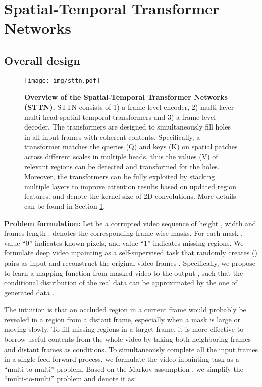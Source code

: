 \documentclass[runningheads]{llncs}
\begin{document}
\section{Spatial-Temporal Transformer Networks}
\label{sec:app}
\subsection{Overall design}
\label{sec:over}

\begin{figure}[t]
   \begin{center}
      \texttt{[image: img/sttn.pdf]}
   \end{center}
   \caption{\textbf{Overview of the Spatial-Temporal Transformer Networks (STTN).}
   STTN consists of 1) a frame-level encoder, 2) multi-layer multi-head spatial-temporal transformers and 3) a frame-level decoder. The transformers are designed to simultaneously fill holes in all input frames with coherent contents. Specifically, a transformer matches the queries (Q) and keys (K) on spatial patches across different scales in multiple heads, thus the values (V) of relevant regions can be detected and transformed for the holes. Moreover, the transformers can be fully exploited by stacking multiple layers to improve attention results based on updated region features.  and  denote the kernel size of 2D convolutions. More details can be found in Section \ref{sec:app}. }
   \label{fig:sttn}
\end{figure}

\textbf{Problem formulation:}
Let  be a corrupted video sequence of height , width  and frames length .
 denotes the corresponding frame-wise masks. For each mask , value ``0'' indicates known pixels, and value ``1'' indicates missing regions. 
We formulate deep video inpainting as a self-supervised task that randomly creates () pairs as input and reconstruct the original video frames . 
Specifically, we propose to learn a mapping function from masked video  to the output , such that the conditional distribution of the real data   can be approximated by the one of generated data . 

The intuition is that an occluded region in a current frame would probably be revealed in a region from a distant frame, especially when a mask is large or moving slowly. 
To fill missing regions in a target frame, it is more effective to borrow useful contents from the whole video by taking both neighboring frames and distant frames as conditions.
To simultaneously complete all the input frames in a single feed-forward process, we formulate the video inpainting task as a ``multi-to-multi'' problem. Based on the Markov assumption \cite{hausman1999independence}, we simplify the ``multi-to-multi'' problem and denote it as:
 
\end{document}
